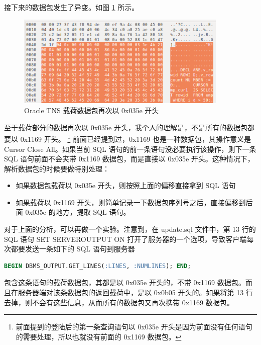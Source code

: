 接下来的数据包发生了异变。如图 \ref{fig:tns-035e-header} 所示。

\begin{figure}[ht!]
    \caption{Oracle TNS 载荷数据包再次以 {\cf 0x035e} 开头}
    \label{fig:tns-035e-header}
    \centering
    \includegraphics[width=0.9\textwidth]{tns-035e-header.png}
\end{figure}

至于载荷部分的数据再次以 {\cf 0x035e} 开头，我个人的理解是，不是所有的数据包都要以 {\cf 0x1169} 开头。
\footnote{前面提到的登陆后的第一条查询语句以 {\cf 0x035e} 开头是因为前面没有任何语句的需要处理，所以也就没有前面的 {\cf 0x1169} 数据包。}
前面已经提到过，{\cf 0x1169} 也是一种数据包，其操作意义是 {\ef Cursor Close All}。如果当前 SQL 语句的前一条语句没必要执行该操作，则下一条 SQL 语句前面不会夹带 {\cf 0x1169} 数据包，而是直接以 {\cf 0x035e} 开头。这种情况下，解析数据包的时候要做特别处理：

\begin{itemize}
    \item 如果数据包载荷以 {\cf 0x035e} 开头，则按照上面的偏移直接拿到 SQL 语句
    \item 如果载荷以 {\cf 0x1169} 开头，则简单记录一下数据包序列号之后，直接偏移到后面 {\cf 0x035e} 的地方，提取 SQL 语句。
\end{itemize}

对于上面的分析，可以再做一个实验。注意到，在 {\ff update.sql} 文件中，第 13 行的 SQL 语句 {\cf SET SERVEROUTPUT ON} 打开了服务器的一个选项，导致客户端每次都要发送一条如下的 SQL 语句到服务器

\begin{lstlisting}[language=sql]
BEGIN DBMS_OUTPUT.GET_LINES(:LINES, :NUMLINES); END;
\end{lstlisting}

包含这条语句的载荷数据包，其都是以 {\cf 0x035e} 开头的，不带 {\cf 0x1169} 数据包。而且在服务器端对该条数据包的返回载荷中，是以 {\cf 0x0b05} 开头的。如果将第 13 行去掉，则不会有这些信息，从而所有的数据包又再次携带 {\cf 0x1169} 数据包。

